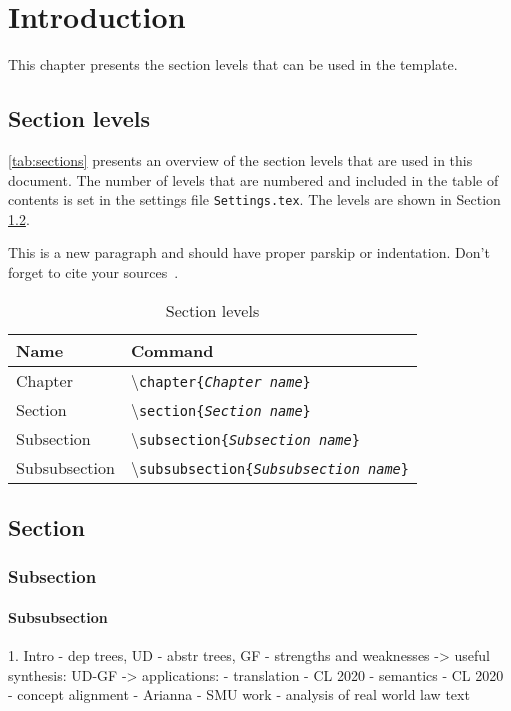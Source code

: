 \chapter{Introduction}
This chapter presents the section levels that can be used in the template. 

\section{Section levels}
\autoref{tab:sections} presents an overview of the section levels that are used in this document. The number of levels that are numbered and included in the table of contents is set in the settings file \texttt{Settings.tex}. The levels are shown in Section \ref{Section_ref}.

This is a new paragraph and should have proper parskip or indentation. Don't forget to cite your sources~\cite{Brajnik2008}. %

\begin{table}[h]
\centering
\caption{Section levels} %
\begin{tabular}{ll} \hline
Name & Command\\ \hline
Chapter & \textbackslash\texttt{chapter\{\emph{Chapter name}\}}\\
Section & \textbackslash\texttt{section\{\emph{Section name}\}}\\
Subsection & \textbackslash\texttt{subsection\{\emph{Subsection name}\}}\\
Subsubsection & \textbackslash\texttt{subsubsection\{\emph{Subsubsection name}\}}\\
\end{tabular}
\label{tab:sections}
\end{table}

\section{Section} \label{Section_ref}
\subsection{Subsection}
\subsubsection{Subsubsection}

1. Intro
- dep trees,
 UD
 - abstr trees, GF
 - strengths and weaknesses
  -> useful synthesis: UD-GF
  -> applications:
    - translation  - CL 2020
    - semantics    - CL 2020
    - concept alignment - Arianna
    - SMU work - analysis of real world law text
